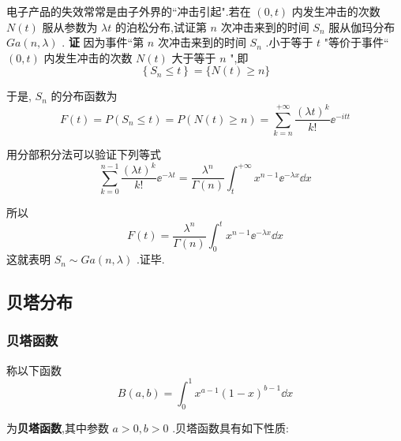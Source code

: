 \begin{example}\label{exam:2.5.6}
	电子产品的失效常常是由子外界的``冲击引起".若在 $ (0,t) $ 内发生冲击的次数 $ N(t) $ 服从参数为 $ \lambda t $ 的泊松分布,试证第 $ n $ 次冲击来到的时间 $ S_{n} $ 服从伽玛分布 $ G a(n, \lambda) $ .
	\textbf{证} 因为事件``第 $ n $ 次冲击来到的时间 $ S_{n} $ .小于等于 $ t $ "等价于事件`` $ (0,t) $ 
	内发生冲击的次数 $ N(t) $ 大于等于 $ n $ ",即
	\[
	\left\{S_{n} \leqslant t\right\}=\{N(t) \geqslant n\}
	\]
	
	于是, $ S_{n} $ 的分布函数为
	\[
	F(t)=P\left(S_{n} \leqslant t\right)=P(N(t) \geqslant n)=\sum_{k=n}^{+\infty} \frac{(\lambda t)^{k}}{k !} \ee ^{-i t t}
	\]
	
	用分部积分法可以验证下列等式
	\begin{equation}
	\sum_{k=0}^{n-1} \frac{(\lambda t)^{k}}{k !} \ee ^{-\lambda t}=\frac{\lambda^{n}}{\Gamma(n)} \int_{t}^{+\infty} x^{n-1} \ee ^{-\lambda x} \dd x \label{eq:2.5.16}
	\end{equation}
	
	所以
	\[
	F(t)=\frac{\lambda^{n}}{\Gamma(n)} \int_{0}^{t} x^{n-1} \ee ^{-\lambda x} \dd x
	\]
	这就表明 $ S_{n} \sim G a(n, \lambda) $ .证毕.
\end{example}

\subsection{贝塔分布}\label{ssec:2.5.5}

\subsubsection{贝塔函数}

称以下函数
\begin{equation}
B(a, b)=\int_{0}^{1} x^{a-1}(1-x)^{b-1} \dd x \label{eq:2.5.17}
\end{equation}

为\textbf{贝塔函数},其中参数 $ a>0,b>0 $ .贝塔函数具有如下性质:

